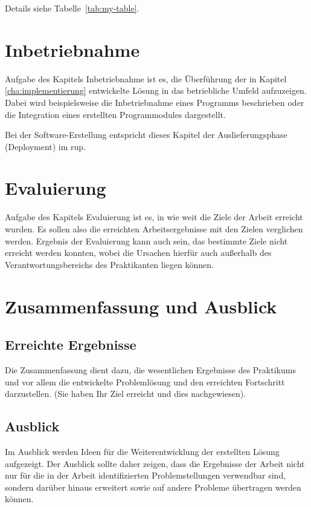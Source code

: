 \documentclass[oneside]{ausarbeitung}
\begin{document}
Details siehe Tabelle~\ref{tab:my-table}.
\chapter{Inbetriebnahme}
\label{cha:inbetriebnahme}

Aufgabe des Kapitels Inbetriebnahme ist es, die Überführung der in 
Kapitel \ref{cha:implementierung} entwickelte Lösung in das betriebliche 
Umfeld aufzuzeigen. Dabei wird beispielsweise die Inbetriebnahme eines 
Programms beschrieben oder die Integration eines erstellten 
Programmodules dargestellt.

Bei der Software-Erstellung entspricht dieses Kapitel der 
Auslieferungsphase (Deployment) im \ac{rup}.

\chapter{Evaluierung}

Aufgabe des Kapitels Evaluierung ist es, in wie weit die Ziele der 
Arbeit erreicht wurden. Es sollen also die erreichten Arbeitsergebnisse 
mit den Zielen verglichen werden. Ergebnis der Evaluierung kann auch 
sein, das bestimmte Ziele nicht erreicht werden konnten, wobei die 
Ursachen hierfür auch außerhalb des Verantwortungsbereichs des 
Praktikanten liegen können.

\chapter{Zusammenfassung und Ausblick}
\label{cha:zusammenfassung}

\section{Erreichte Ergebnisse}
\label{sec:ergebnisse}

Die Zusammenfassung dient dazu, die wesentlichen Ergebnisse des 
Praktikums und vor allem die entwickelte Problemlösung und den 
erreichten Fortschritt darzustellen. (Sie haben Ihr Ziel erreicht und 
dies nachgewiesen).

\section{Ausblick}
\label{sec:ausblick}

Im Ausblick werden Ideen für die Weiterentwicklung der erstellten Lösung 
aufgezeigt. Der Ausblick sollte daher zeigen, dass die Ergebnisse der 
Arbeit nicht nur für die in der Arbeit identifizierten Problemstellungen 
verwendbar sind, sondern darüber hinaus erweitert sowie auf andere 
Probleme übertragen werden können.
\end{document}
